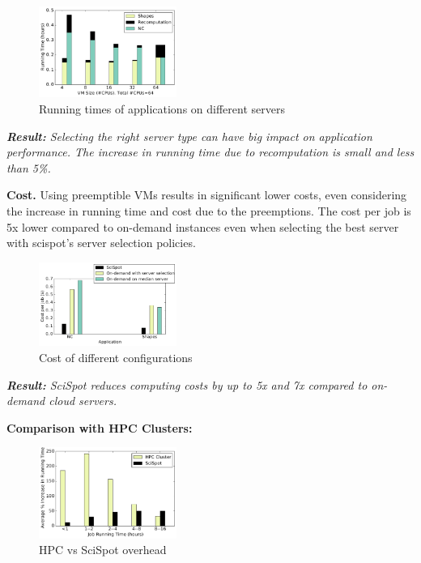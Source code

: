 \begin{figure}
  \centering
  \includegraphics[width=0.4\textwidth]{../graphs/runtime-bars.pdf}
  \caption{Running times of applications on different servers}
  \label{fig:runtimes-bar}
\end{figure}


\noindent \emph{ \textbf{Result:} Selecting the right server type can have big impact on application performance. The increase in running time due to recomputation is small and less than 5\%.}


\noindent \textbf{Cost.} Using preemptible VMs results in significant lower costs, even considering the increase in running time and cost due to the preemptions.
The cost per job is 5x lower compared to on-demand instances even when selecting the best server with scispot's server selection policies.



\begin{figure}
  \centering
  \includegraphics[width=0.4\textwidth]{../graphs/cost-only-bar.pdf}
  \caption{Cost of different configurations}
  \label{fig:cost-only-bar}
\end{figure}

\noindent \emph{ \textbf{Result:} SciSpot reduces computing costs by up to 5x and 7x compared to on-demand cloud servers.}


\noindent \textbf{Comparison with HPC Clusters:}

\begin{figure}[t]
  \centering 
  \includegraphics[width=0.4\textwidth]{../graphs/hpc-vs-scispot.pdf}
  \caption{HPC vs SciSpot overhead}
  \label{fig:hpc-vs-scispot}

\end{figure}

